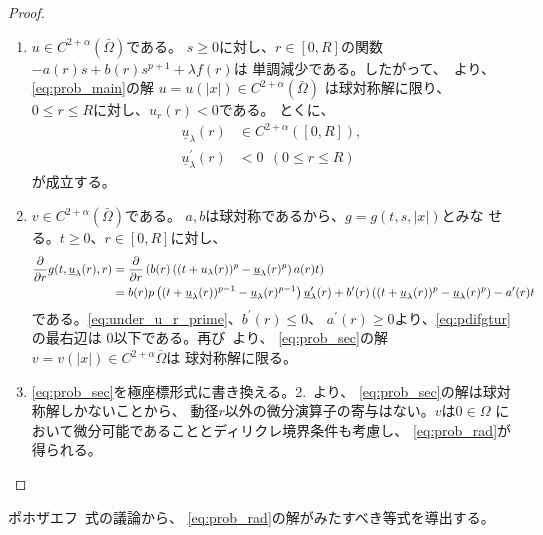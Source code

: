\begin{proof}
 \begin{enumerate}[1.] \sage
  \item $u \in C^{2+\alpha}(\bar{\Omega})$である。
        $s \geq 0$に対し、$r \in [0, R]$の関数
        $-a(r) s + b(r) s^{p+1} + \lambda f(r)$は
        単調減少である。したがって、\cite{MR544879}~より、
        \ref{eq:prob_main}の解
        $u = u(\lvert x \rvert) \in C^{2+\alpha}(\bar{\Omega})$
        は球対称解に限り、
        $0 \leq r \leq R$に対し、$u_r (r) < 0$である。
        とくに、
        \begin{align}
         \underline{u}_\lambda(r) & \in C^{2+ \alpha}([0, R]), 
          \label{eq:under_u_r} \\
         \underline{u}_\lambda^\prime(r) &< 0 \ \ (0 \leq r \leq R)
          \label{eq:under_u_r_prime}
        \end{align}
        が成立する。
  \item $v \in C^{2+\alpha}(\bar{\Omega})$である。
        $a, b$は球対称であるから、$g = g(t, s, \lvert x \rvert)$とみな
        せる。$t \geq 0$、$r \in [0, R]$に対し、
        \begin{align}
         \frac{\partial }{\partial r} g(t, \underline{u}_\lambda(r), r)
         &= \frac{\partial }{\partial r} \left( b(r) \left( (t + u_\lambda(r))^p -
         \underline{u}_\lambda(r)^p \right) a(r) t \right) \notag \\
         &= b(r) p \left( (t+ \underline{u}_\lambda(r))^{p-1} -
         \underline{u}_\lambda(r)^{p-1} \right)
         \underline{u}_\lambda^\prime(r) + b^\prime(r) \left( (t +
         \underline{u}_\lambda(r))^p  - \underline{u}_\lambda(r)^p
         \right) - a^\prime(r) t \label{eq:pdifgtur}
        \end{align}
        である。\eqref{eq:under_u_r_prime}、$b^\prime(r) \leq 0$、
        $a^\prime(r) \geq 0$より、\eqref{eq:pdifgtur}の最右辺は
        $0$以下である。再び\cite{MR544879}~より、
        \ref{eq:prob_sec}の解
        $v = v(\lvert x \rvert) \in C^{2+\alpha}\bar{\Omega}$は
        球対称解に限る。
  \item \ref{eq:prob_sec}を極座標形式に書き換える。2.~より、
        \ref{eq:prob_sec}の解は球対称解しかないことから、
        動径$r$以外の微分演算子の寄与はない。$v$は$0 \in \Omega$
        において微分可能であることとディリクレ境界条件も考慮し、
        \eqref{eq:prob_rad}が得られる。\qedhere
 \end{enumerate}
\end{proof}

ポホザエフ\cite{MR0192184}~式の議論から、
\eqref{eq:prob_rad}の解がみたすべき等式を導出する。

